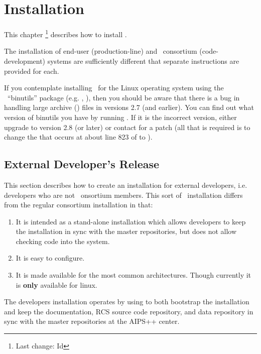 \chapter{Installation}
\label{Installation}

This chapter \footnote{Last change:
$ $Id$ $}
describes how to install \aipspp.

The installation of end-user (production-line) and \aipspp\ consortium
(code-development) systems are sufficiently different that separate
instructions are provided for each.

If you contemplate installing \aipspp\ for the Linux operating system using
the \gnu\ ``binutils'' package (e.g. , ), then you should be
aware that there is a bug in handling large archive () files in
versions 2.7 (and earlier).  You can find out what version of binutils you
have by running .  If it is the incorrect version, either upgrade
to version 2.8 (or later) or contact  for a patch
(all that is required is to change the  that occurs at about line
823 of  to ).


\section{External Developer's Release}
\label{developers-release}

This section describes how to create an installation for external developers,
i.e. developers who are not \aipspp\ onsortium members. This sort
of \aipspp\ installation differs from the regular consortium
installation in that:
\begin{enumerate}
\item It is intended as a stand-alone installation which allows developers
      to keep the installation in sync with the master repositories, but
      does not allow checking code into the system.
\item It is easy to configure.
\item It is made available for the most common architectures. Though currently
      it is {\bf only} available for linux.
\end{enumerate}
The developers installation operates by using
 to
both bootstrap the installation and keep the documentation, RCS source code
repository, and data repository in sync with the master repositories at the
AIPS++ center.

